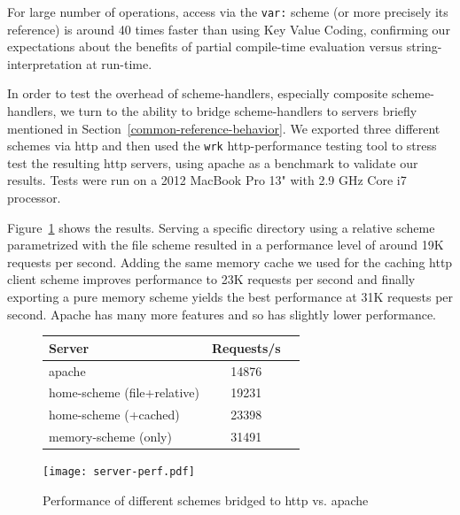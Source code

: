 \documentclass{acm_proc_article-sp}
\begin{document}
For large number of operations, access via the {\tt var:} scheme (or more precisely its reference) is
around 40 times faster than using Key Value Coding, confirming our expectations about the benefits
of partial compile-time evaluation versus string-interpretation at run-time.  

In order to test the overhead of scheme-handlers, especially composite scheme-handlers, we turn
to the ability to bridge scheme-handlers to servers briefly mentioned in Section~\ref{common-reference-behavior}.
We exported three different schemes via http and then used the {\tt wrk} http-performance testing tool to stress
test the resulting http servers, using apache as a benchmark to validate our results.  Tests were run on a 2012 MacBook Pro 13" with 2.9 GHz Core i7 processor.

Figure~\ref{http-server-speed} shows the results.  Serving a specific directory using a relative scheme parametrized
with the file scheme resulted in a performance level of around 19K requests per second.  Adding the same memory cache
we used for the caching http client scheme improves performance to 23K requests per second and finally exporting a pure
memory scheme yields the best performance at 31K requests per second.   Apache has many more features and so
has slightly lower performance.

\begin{figure}
\begin{minipage}[c]{0.58\textwidth}
\begin{tabular}{|l|c|c|} \hline
Server   &  Requests/s    \\ \hline
apache & 	14876	      \\ %
home-scheme (file+relative) &  19231   \\ %
home-scheme (+cached)  &  23398  \\ %
memory-scheme (only) &  31491  \\ \hline
\end{tabular}
\end{minipage}
\begin{minipage}[c]{0.58\textwidth}
\texttt{[image: server-perf.pdf]}
\end{minipage}
\vspace{-2.0em}
\caption{Performance of different schemes bridged to http vs. apache}
\label{http-server-speed}
\end{figure}



\end{document}
